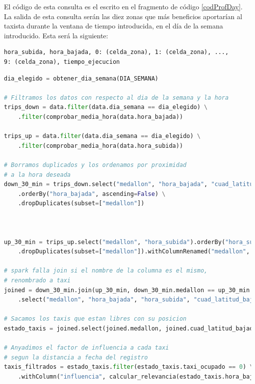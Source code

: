 El código de esta consulta es el escrito en el fragmento de código \ref{codProfDay}. La salida de esta consulta serán las diez zonas que más beneficios aportarían al taxista durante la ventana de tiempo introducida, en el día de la semana introducido. Esta será la siguiente:

\begin{verbatim}
hora_subida, hora_bajada, 0: (celda_zona), 1: (celda_zona), ..., 
9: (celda_zona), tiempo_ejecucion
\end{verbatim}

\begin{lstlisting}[label=codProfDay,language=Python,frame=single,caption=Código de la consulta para obtener las diez zonas que proporcionan más beneficios al taxista teniendo en cuenta la estacionalidad]
dia_elegido = obtener_dia_semana(DIA_SEMANA)

# Filtramos los datos con respecto al dia de la semana y la hora
trips_down = data.filter(data.dia_semana == dia_elegido) \
    .filter(comprobar_media_hora(data.hora_bajada))

trips_up = data.filter(data.dia_semana == dia_elegido) \
    .filter(comprobar_media_hora(data.hora_subida))

# Borramos duplicados y los ordenamos por proximidad 
# a la hora deseada
down_30_min = trips_down.select("medallon", "hora_bajada", "cuad_latitud_bajada", "cuad_longitud_bajada") \
    .orderBy("hora_bajada", ascending=False) \
    .dropDuplicates(subset=["medallon"])



up_30_min = trips_up.select("medallon", "hora_subida").orderBy("hora_subida", ascending=False) \
    .dropDuplicates(subset=["medallon"]).withColumnRenamed("medallon", "taxi")

# spark falla join si el nombre de la columna es el mismo,
# renombrado a taxi
joined = down_30_min.join(up_30_min, down_30_min.medallon == up_30_min.taxi, "leftouter") \
    .select("medallon", "hora_bajada", "hora_subida", "cuad_latitud_bajada", "cuad_longitud_bajada")

# Sacamos los taxis que estan libres con su posicion
estado_taxis = joined.select(joined.medallon, joined.cuad_latitud_bajada, joined.cuad_longitud_bajada, joined.hora_bajada, when(joined.hora_subida > joined.hora_bajada, 1).otherwise(0).alias("taxi_ocupado"))

# Anyadimos el factor de influencia a cada taxi
# segun la distancia a fecha del registro
taxis_filtrados = estado_taxis.filter(estado_taxis.taxi_ocupado == 0) \
    .withColumn("influencia", calcular_relevancia(estado_taxis.hora_bajada))


\end{lstlisting}
